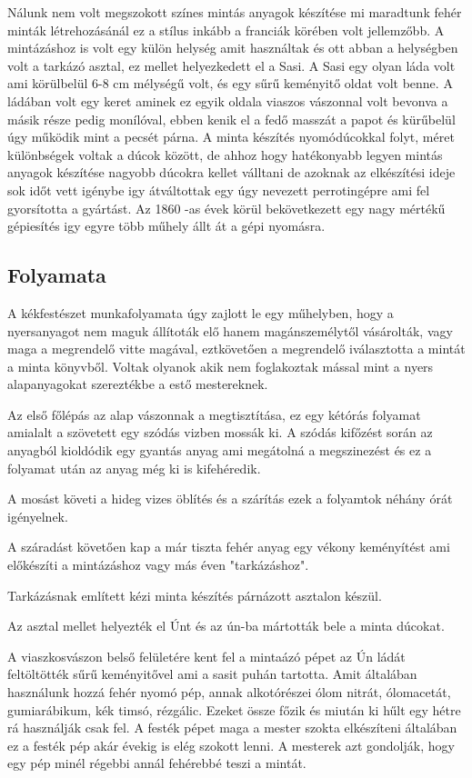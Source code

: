 \documentclass[fontsize=12pt, appendixprefix=true]{scrreprt}
\begin{document}
Nálunk nem volt megszokott színes mintás anyagok készítése mi maradtunk fehér minták létrehozásánál ez a stílus inkább a franciák körében volt jellemzőbb. A mintázáshoz is volt egy külön helység amit használtak és ott abban a helységben volt a tarkázó asztal, ez mellet helyezkedett el a Sasi.
A Sasi egy olyan láda volt ami körülbelül 6-8 cm mélységű volt, és egy sűrű keményitő oldat volt benne. A ládában volt egy keret aminek ez egyik oldala viaszos vászonnal volt bevonva a másik része pedig monílóval, ebben kenik el a fedő masszát a papot és kürűbelül úgy működik mint a pecsét párna.
A minta készítés nyomódúcokkal folyt, méret különbségek voltak a dúcok között, de ahhoz hogy hatékonyabb legyen mintás anyagok készítése nagyobb dúcokra kellet válltani de azoknak az elkészítési ideje sok időt vett igénybe igy átváltottak egy úgy nevezett perrotingépre ami fel gyorsította a gyártást. Az 1860 -as évek körül bekövetkezett egy nagy mértékű gépiesítés igy egyre több műhely állt át a gépi nyomásra.


\subsection{Folyamata}
A kékfestészet munkafolyamata úgy zajlott le egy műhelyben, hogy a nyersanyagot nem maguk állítoták elő hanem magánszemélytől vásárolták,  vagy maga a megrendelő vitte magával, eztkövetően a megrendelő iválasztotta a mintát a minta könyvből. 
Voltak olyanok akik nem foglakoztak mással mint a nyers alapanyagokat szereztékbe a estő mestereknek.

Az első főlépás az alap vászonnak a megtisztítása, ez egy kétórás folyamat amialalt a szövetett egy szódás vizben mossák ki. A szódás kifőzést során az anyagból kioldódik egy gyantás anyag ami megátolná a megszinezést és ez a folyamat után az anyag még ki is kifehéredik.

A mosást követi a hideg vizes öblítés és a szárítás ezek a folyamtok néhány órát igényelnek.

A száradást követően kap a már tiszta fehér anyag egy vékony keményítést ami előkészíti a mintázáshoz vagy más éven "tarkázáshoz".

Tarkázásnak említett kézi minta készítés párnázott asztalon készül.

Az asztal mellet helyezték el Únt és az ún-ba mártották bele a minta dúcokat.

A viaszkosvászon belső felületére kent fel a mintaázó pépet az Ún ládát feltöltötték sűrű keményitővel ami a sasit puhán tartotta. Amit általában használunk hozzá fehér nyomó pép, annak alkotórészei ólom nitrát, ólomacetát, gumiarábikum, kék timsó, rézgálic. Ezeket össze főzik és miután ki hűlt egy hétre rá használják csak fel. A festék pépet maga a mester szokta elkészíteni általában ez a festék pép akár évekig is elég szokott lenni. A mesterek azt gondolják, hogy egy pép minél régebbi annál fehérebbé teszi a mintát.
\end{document}
